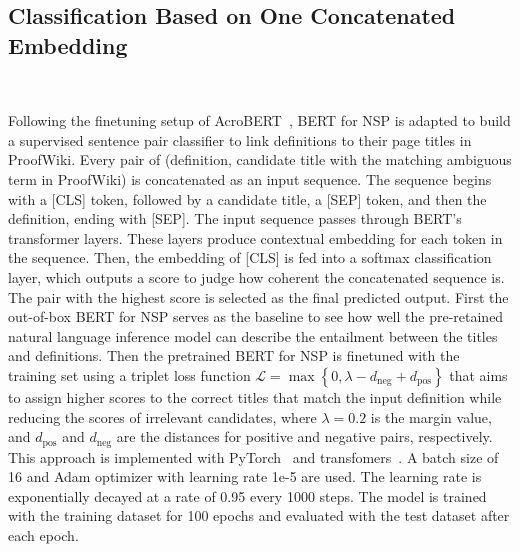 \subsection{Classification Based on One Concatenated Embedding}
~\label{sec:nsp}

Following the finetuning setup of AcroBERT~\cite{chen2023gladis}, %
BERT for NSP is adapted to build a supervised sentence pair classifier to link definitions to their page titles in ProofWiki. Every pair of (definition, candidate title with the matching ambiguous term in ProofWiki) is concatenated as an input sequence. The sequence begins with a [CLS] token, followed by a candidate title, a [SEP] token, and then the definition, ending with [SEP]. The input sequence passes through BERT's transformer layers. These layers produce contextual embedding for each token in the sequence. Then, the embedding of [CLS] is fed into a softmax classification layer, which outputs a score to judge how coherent the concatenated sequence is. %
The pair with the highest score is selected as the final predicted output. %
First the out-of-box BERT for NSP serves as the baseline to see how well the pre-retained natural language inference model can describe the entailment between the titles and definitions. %
Then the pretrained BERT for NSP is finetuned with the training set using a triplet loss function $\mathcal{L} = \max \left \{ 0, \lambda - d_{\text{neg} } + d_{\text{pos} } \right \}$ that aims to assign higher scores to the correct titles that match the input definition while reducing the scores of irrelevant candidates, where $\lambda = 0.2$ is the margin value, and $d_{\text{pos}}$ and $d_{\text{neg}}$ are the distances for positive and negative pairs, respectively. %
This approach is implemented with PyTorch~\cite{paszke2019pytorch} and transfomers~\cite{wolf-etal-2020-transformers}. %
A batch size of 16 and Adam optimizer with learning rate 1e-5 are used. The learning rate is exponentially decayed at a rate of 0.95 every 1000 steps. %
The model is trained with the training dataset for 100 epochs and evaluated with the test dataset after each epoch. %



